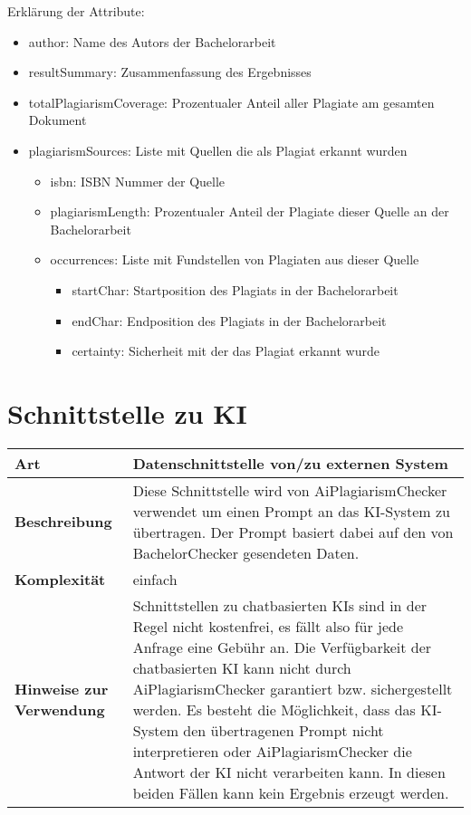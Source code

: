 Erklärung der Attribute:
\begin{itemize}
    \item author: Name des Autors der Bachelorarbeit
    \item resultSummary: Zusammenfassung des Ergebnisses
    \item totalPlagiarismCoverage: Prozentualer Anteil aller Plagiate am gesamten Dokument
    \item plagiarismSources: Liste mit Quellen die als Plagiat erkannt wurden
    \begin{itemize}
        \item isbn: ISBN Nummer der Quelle
        \item plagiarismLength: Prozentualer Anteil der Plagiate dieser Quelle an der Bachelorarbeit
        \item occurrences: Liste mit Fundstellen von Plagiaten aus dieser Quelle
        \begin{itemize}
            \item startChar: Startposition des Plagiats in der Bachelorarbeit
            \item endChar: Endposition des Plagiats in der Bachelorarbeit
            \item certainty: Sicherheit mit der das Plagiat erkannt wurde
        \end{itemize}
    \end{itemize}
\end{itemize}

\section{Schnittstelle zu KI}\label{sec:schnittstelle-ki}
\begin{tabularx}{\textwidth}{l|X}
    \hline
    \textbf{Art} & Datenschnittstelle von/zu externen System \\
    \hline
    \textbf{Beschreibung} & Diese Schnittstelle wird von AiPlagiarismChecker verwendet um einen Prompt an das KI-System zu übertragen.
                            Der Prompt basiert dabei auf den von BachelorChecker gesendeten Daten.\\
    \hline
    \textbf{Komplexität} & einfach \\
    \hline
    \textbf{Hinweise zur Verwendung} & Schnittstellen zu chatbasierten KIs sind in der Regel nicht kostenfrei, es fällt also für jede Anfrage eine Gebühr an.
                                        Die Verfügbarkeit der chatbasierten KI kann nicht durch AiPlagiarismChecker garantiert bzw. sichergestellt werden.
                                        Es besteht die Möglichkeit, dass das KI-System den übertragenen Prompt nicht interpretieren oder AiPlagiarismChecker die Antwort der KI nicht verarbeiten kann.
                                        In diesen beiden Fällen kann kein Ergebnis erzeugt werden.\\
\end{tabularx}